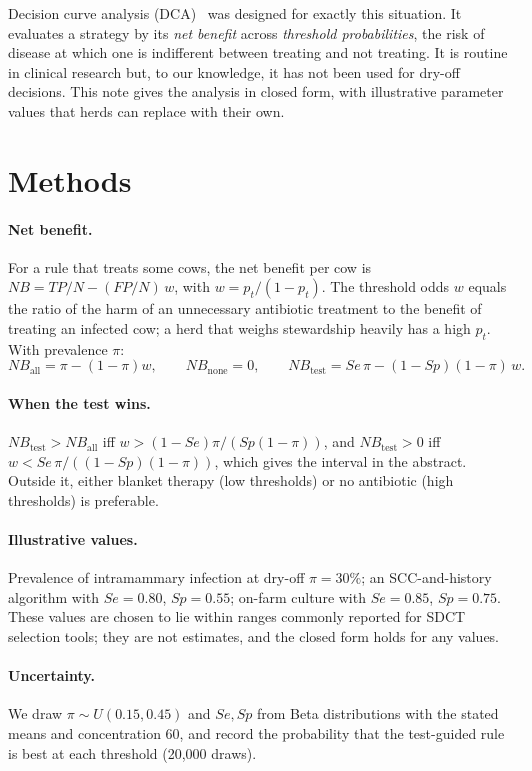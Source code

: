 \documentclass[11pt]{article}
\begin{document}
Decision curve analysis (DCA)~\cite{Vickers2006,Vickers2019} was designed for exactly this situation. It evaluates a
strategy by its \emph{net benefit} across \emph{threshold probabilities}, the risk of disease at which one is
indifferent between treating and not treating. It is routine in clinical research but, to our knowledge, it has not
been used for dry-off decisions. This note gives the analysis in closed form, with illustrative parameter values that
herds can replace with their own.

\section{Methods}
\paragraph{Net benefit.} For a rule that treats some cows, the net benefit per cow is
$NB = TP/N - (FP/N)\,w$, with $w=p_t/(1-p_t)$. The threshold odds $w$ equals the ratio of the harm of an unnecessary
antibiotic treatment to the benefit of treating an infected cow; a herd that weighs stewardship heavily has a high
$p_t$. With prevalence $\pi$:
\[ NB_{\text{all}}=\pi-(1-\pi)w,\qquad NB_{\text{none}}=0,\qquad NB_{\text{test}}=Se\,\pi-(1-Sp)(1-\pi)\,w. \]
\paragraph{When the test wins.} $NB_{\text{test}}>NB_{\text{all}}$ iff $w>(1-Se)\pi/(Sp(1-\pi))$, and
$NB_{\text{test}}>0$ iff $w<Se\,\pi/((1-Sp)(1-\pi))$, which gives the interval in the abstract. Outside it, either
blanket therapy (low thresholds) or no antibiotic (high thresholds) is preferable.
\paragraph{Illustrative values.} Prevalence of intramammary infection at dry-off $\pi=30\%$; an SCC-and-history
algorithm with $Se=0.80$, $Sp=0.55$; on-farm culture with $Se=0.85$, $Sp=0.75$. These values are chosen to lie
within ranges commonly reported for SDCT selection tools; they are not estimates, and the closed form holds for any
values.
\paragraph{Uncertainty.} We draw $\pi\sim U(0.15,0.45)$ and $Se,Sp$ from Beta distributions with the stated means and
concentration 60, and record the probability that the test-guided rule is best at each threshold (20{,}000 draws).
\end{document}
